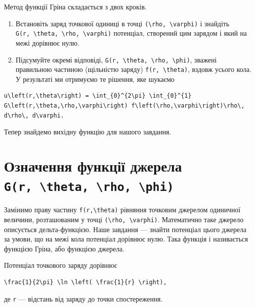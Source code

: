 \documentclass[
  ukrainian,
]{article}
\begin{document}
Метод функції Гріна складається з двох кроків.

\begin{enumerate}
\def\labelenumi{\arabic{enumi}.}
\item
  Встановіть заряд точкової одиниці в точці
  \texttt{(\textbackslash{}rho,\ \textbackslash{}varphi)} і знайдіть
  \texttt{G(r,\ \textbackslash{}theta,\ \textbackslash{}rho,\ \textbackslash{}varphi)}
  потенціал, створений цим зарядом і який на межі дорівнює нулю.
\item
  Підсумуйте окремі відповіді,
  \texttt{G(r,\ \textbackslash{}theta,\ \textbackslash{}rho,\ \textbackslash{}phi)},
  зважені правильною частиною (щільністю заряду)
  \texttt{f(r,\ \textbackslash{}theta)}, вздовж усього кола. У
  результаті ми отримуємо те рішення, яке шукаємо
\end{enumerate}

\begin{verbatim}
u\left(r,\theta\right) = \int_{0}^{2\pi} \int_{0}^{1} G\left(r,\theta,\rho,\varphi\right) f\left(\rho,\varphi\right)\rho\, d\rho\, d\varphi.
\end{verbatim}

Тепер знайдемо вихідну функцію для нашого завдання.

\section{\texorpdfstring{Означення функції джерела
\texttt{G(r,\ \textbackslash{}theta,\ \textbackslash{}rho,\ \textbackslash{}phi)}}{Означення функції джерела G(r, \textbackslash theta, \textbackslash rho, \textbackslash phi)}}\label{ux43eux437ux43dux430ux447ux435ux43dux43dux44f-ux444ux443ux43dux43aux446ux456ux457-ux434ux436ux435ux440ux435ux43bux430-gr-theta-rho-phi}

Замінимо праву частину \texttt{f(r,\textbackslash{}theta)} рівняння
точковим джерелом одиничної величини, розташованим у точці
\texttt{(\textbackslash{}rho,\ \textbackslash{}varphi)}. Математично
таке джерело описується дельта-функцією. Наше завдання --- знайти
потенціал цього джерела за умови, що на межі кола потенціал дорівнює
нулю. Така функція і називається функцією Гріна, або функцією джерела.

Потенціал точкового заряду дорівнює

\begin{verbatim}
\frac{1}{2\pi} \ln \left( \frac{1}{r} \right),
\end{verbatim}

де \texttt{r} --- відстань від заряду до точки спостереження.
\end{document}
